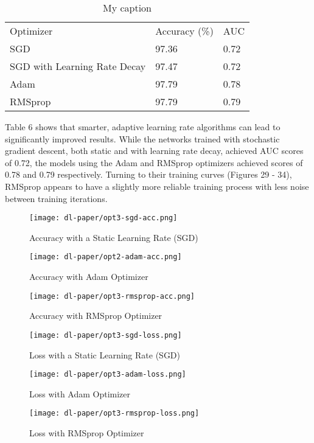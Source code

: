 \documentclass[12pt]{article}  %
\theoremstyle{definition}
\theoremstyle{remark}
\begin{document}
\begin{table}[!h]
\centering
\caption{My caption}
\label{my-label}
\begin{tabular}{lll}
Optimizer                    & Accuracy (\%) & AUC  \\
SGD                 & 97.36         & 0.72 \\
SGD with Learning Rate Decay & 97.47         & 0.72 \\
Adam                & 97.79         & 0.78 \\
RMSprop                      & 97.79         & 0.79
\end{tabular}
\end{table}

\par Table 6 shows that smarter, adaptive learning rate algorithms can lead to significantly improved results. While the networks trained with stochastic gradient descent, both static and with learning rate decay, achieved AUC scores of 0.72, the models using the Adam and RMSprop optimizers achieved scores of 0.78 and 0.79 respectively. Turning to their training curves (Figures 29 - 34), RMSprop appears to have a slightly more reliable training process with less noise between training iterations. 

\begin{figure}[!h]
  \texttt{[image: dl-paper/opt3-sgd-acc.png]}
  \caption{Accuracy with a Static Learning Rate (SGD)}\label{sgd-acc}
\endminipage\hfill
{}
  \texttt{[image: dl-paper/opt2-adam-acc.png]}
  \caption{Accuracy with Adam Optimizer}\label{adam-acc}
\endminipage\hfill
{}
  \texttt{[image: dl-paper/opt3-rmsprop-acc.png]}
  \caption{Accuracy with RMSprop Optimizer}\label{rmsprop-acc}
\endminipage
\end{figure}


\begin{figure}[!h]
  \texttt{[image: dl-paper/opt3-sgd-loss.png]}
  \caption{Loss with a Static Learning Rate (SGD)}\label{sgd-loss}
\endminipage\hfill
{}
  \texttt{[image: dl-paper/opt3-adam-loss.png]}
  \caption{Loss with Adam Optimizer}\label{adam-loss}
\endminipage\hfill
{}
  \texttt{[image: dl-paper/opt3-rmsprop-loss.png]}
  \caption{Loss with RMSprop Optimizer}\label{rmsprop-loss}
\endminipage
\end{figure}
\end{document}
